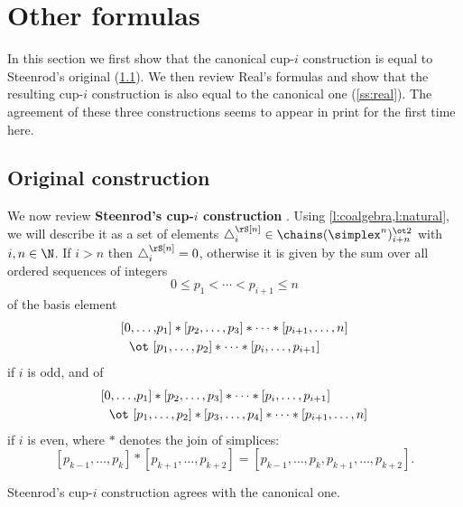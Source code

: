 
\section{Other formulas}\label{s:others}

In this section we first show that the canonical \mbox{cup-$i$} construction is equal to Steenrod's original (\cref{ss:original}).
We then review Real's formulas and show that the resulting \mbox{cup-$i$} construction is also equal to the canonical one (\cref{ss:real}).
The agreement of these three constructions seems to appear in print for the first time here.

\subsection{Original construction}\label{ss:original}

We now review \textbf{Steenrod's \mbox{cup-$i$} construction} \cite[p.293]{steenrod1947products}.
Using \cref{l:coalgebra,l:natural}, we will describe it as a set of elements $\triangle_i^\rS [n] \in \chains(\simplex^n)^{\ot 2}_{i+n}$ with $i,n \in \N$.
If $i > n$ then $\triangle_i^\rS [n] = 0$, otherwise it is given by the sum over all ordered sequences of integers
\[
0 \leq p_1 < \cdots < p_{i+1} \leq n
\]
of the basis element
\begin{equation}\label{e:original i odd}
\begin{split}
[ 0, \dots, &{p_1} ] \ast [ {p_2}, \dots, {p_3} ] \ast \cdots \ast [ {p_{i+1}}, \dots, n ] \\
\ot \ [ &{p_1}, \dots, {p_2} ] \ast \cdots \ast [ {p_{i}}, \dots, {p_{i+1}} ]
\end{split}
\end{equation}
if $i$ is odd, and of
\begin{equation}\label{e:original i even}
\begin{split}
[ 0, \dots, &{p_1} ] \ast [ {p_2}, \dots, {p_3} ] \ast \cdots \ast [ {p_{i}}, \dots, {p_{i+1}} ] \\
\ot \ [ &{p_1}, \dots, {p_2} ] \ast [ {p_3}, \dots, {p_4} ] \ast \cdots \ast [ {p_{i+1}}, \dots, n ]
\end{split}
\end{equation}
if $i$ is even, where $\ast$ denotes the join of simplices:
\[
[{p_{k-1}}, \dots, {p_{k}} ] \ast [ {p_{k+1}}, \dots, p_{k+2}] = [{p_{k-1}}, \dots, p_k, p_{k+1}, \dots, p_{k+2}].
\]

\begin{theorem}\label{t:steenrod cup-i}
	Steenrod's \mbox{cup-$i$} construction agrees with the canonical one.
\end{theorem}

